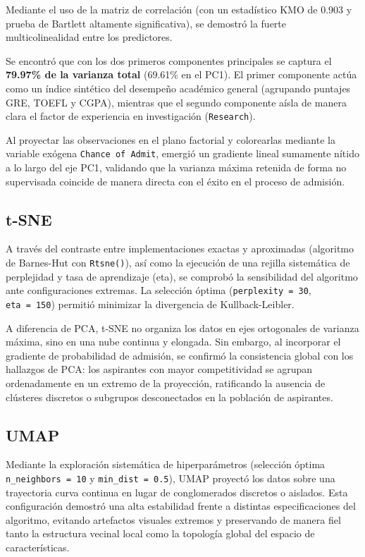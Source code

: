 \documentclass[
  10pt,
  a4paper]{article}
\begin{document}
Mediante el uso de la matriz de correlación (con un estadístico KMO de 0.903 y prueba de Bartlett altamente significativa), se demostró la fuerte multicolinealidad entre los predictores.

Se encontró que con los dos primeros componentes principales se captura el \textbf{79.97\% de la varianza total} (69.61\% en el PC1). El primer componente actúa como un índice sintético del desempeño académico general (agrupando puntajes GRE, TOEFL y CGPA), mientras que el segundo componente aísla de manera clara el factor de experiencia en investigación (\texttt{Research}).

Al proyectar las observaciones en el plano factorial y colorearlas mediante la variable exógena \texttt{Chance\ of\ Admit}, emergió un gradiente lineal sumamente nítido a lo largo del eje PC1, validando que la varianza máxima retenida de forma no supervisada coincide de manera directa con el éxito en el proceso de admisión.

\subsection{t-SNE}\label{t-sne-1}

A través del contraste entre implementaciones exactas y aproximadas (algoritmo de Barnes-Hut con \texttt{Rtsne()}), así como la ejecución de una rejilla sistemática de perplejidad y tasa de aprendizaje (eta), se comprobó la sensibilidad del algoritmo ante configuraciones extremas. La selección óptima (\texttt{perplexity\ =\ 30}, \texttt{eta\ =\ 150}) permitió minimizar la divergencia de Kullback-Leibler.

A diferencia de PCA, t-SNE no organiza los datos en ejes ortogonales de varianza máxima, sino en una nube continua y elongada. Sin embargo, al incorporar el gradiente de probabilidad de admisión, se confirmó la consistencia global con los hallazgos de PCA: los aspirantes con mayor competitividad se agrupan ordenadamente en un extremo de la proyección, ratificando la ausencia de clústeres discretos o subgrupos desconectados en la población de aspirantes.

\subsection{UMAP}\label{umap-1}

Mediante la exploración sistemática de hiperparámetros (selección óptima \texttt{n\_neighbors\ =\ 10} y \texttt{min\_dist\ =\ 0.5}), UMAP proyectó los datos sobre una trayectoria curva continua en lugar de conglomerados discretos o aislados. Esta configuración demostró una alta estabilidad frente a distintas especificaciones del algoritmo, evitando artefactos visuales extremos y preservando de manera fiel tanto la estructura vecinal local como la topología global del espacio de características.
\end{document}
